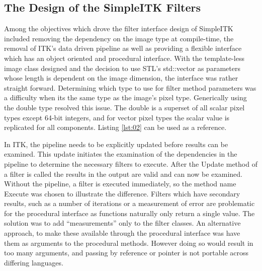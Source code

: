 \documentclass{frontiersMED} %
\begin{document}
\subsection{The Design of the SimpleITK Filters}
Among the objectives which drove the filter interface design of
SimpleITK included removing the dependency on the image type at
compile-time, the removal of ITK's data driven pipeline as well as
providing a flexible interface which has an object oriented and
procedural interface. With the template-less image class designed and
the decision to use STL's std::vector as parameters whose length is
dependent on the image dimension, the interface was rather straight
forward. Determining which type to use for filter method parameters
was a difficulty when its the same type as the image's pixel
type. Generically using the double type resolved this issue. The
double is a superset of all scalar pixel types except 64-bit integers,
and for vector pixel types the scalar value is replicated for all
components. Listing \ref{lst:02} can be used as a reference.



In ITK, the pipeline needs to be explicitly updated before results can
be examined. This update initiates the examination of the dependencies
in the pipeline to determine the necessary filters to execute. After
the Update method of a filter is called the results in the output are
valid and can now be examined. Without the pipeline, a filter is
executed immediately, so the method name Execute was chosen to
illustrate the difference. Filters which have secondary results, such
as a number of iterations or a measurement of error are problematic
for the procedural interface as functions naturally only return a
single value. The solution was to add “measurements” only to the
filter classes. An alternative approach, to make these available
through the procedural interface was  have them as arguments to the
procedural methods. However doing so would result in too many
arguments, and passing by reference or pointer is not portable across
differing languages.
\end{document}
